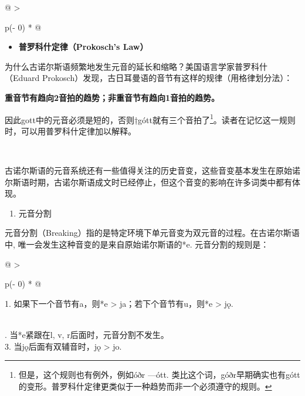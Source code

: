 \begin{longtable}[]{@{}
  >{\raggedright\arraybackslash}p{(\columnwidth - 0\tabcolsep) * }@{}}
\toprule\noalign{}
\begin{minipage}[b]{\linewidth}\raggedright
\begin{itemize}
\item
  \textbf{普罗科什定律（Prokosch's Law）}
\end{itemize}

为什么古诺尔斯语频繁地发生元音的延长和缩略？美国语言学家普罗科什（Eduard
Prokosch）发现，古日耳曼语的音节有这样的规律（用格律划分法）：

\textbf{重音节有趋向2音拍的趋势；非重音节有趋向1音拍的趋势。}

因此gott中的元音必须是短的，否则†gótt就有三个音拍了\footnote{但是，这个规则也有例外，例如óðr
  ---ótt.
  类比这个词，góðr早期确实也有gótt的变形。普罗科什定律更类似于一种趋势而非一个必须遵守的规则。}。读者在记忆这一规则时，可以用普罗科什定律加以解释。
\end{minipage} \\
\midrule\noalign{}
\endhead
\bottomrule\noalign{}
\endlastfoot
\end{longtable}

古诺尔斯语的元音系统还有一些值得关注的历史音变，这些音变基本发生在原始诺尔斯语时期，古诺尔斯语成文时已经停止，但这个音变的影响在许多词类中都有体现。

\begin{enumerate}
\def\labelenumi{\Alph{enumi}.}
\setcounter{enumi}{3}
\item
  元音分割
\end{enumerate}

元音分割（Breaking）指的是特定环境下单元音变为双元音的过程。在古诺尔斯语中,
唯一会发生这种音变的是来自原始诺尔斯语的*e. 元音分割的规则是：

\begin{longtable}[]{@{}
  >{\raggedright\arraybackslash}p{(\columnwidth - 0\tabcolsep) * }@{}}
\toprule\noalign{}
\begin{minipage}[b]{\linewidth}\raggedright
1. 如果下一个音节有a，则*e \textgreater{} ja；若下个音节有u，则*e
\textgreater{} jǫ.
\end{minipage} \\
\midrule\noalign{}
\endhead
\bottomrule\noalign{}
. 当*e紧跟在l, v, r后面时，元音分割不发生。 \\
3. 当jǫ后面有双辅音时，jǫ \textgreater{} jo. \\
\end{longtable}

